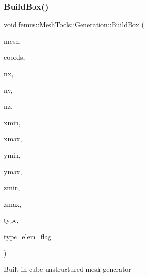 \subsubsection{\texorpdfstring{Build\+Box()}{BuildBox()}}
{\footnotesize\ttfamily void femus\+::\+Mesh\+Tools\+::\+Generation\+::\+Build\+Box (\begin{DoxyParamCaption}\item[{\mbox{\hyperlink{classfemus_1_1_mesh}{Mesh}} \&}]{mesh,  }\item[{vector$<$ vector$<$ double $>$ $>$ \&}]{coords,  }\item[{const unsigned int}]{nx,  }\item[{const unsigned int}]{ny,  }\item[{const unsigned int}]{nz,  }\item[{const double}]{xmin,  }\item[{const double}]{xmax,  }\item[{const double}]{ymin,  }\item[{const double}]{ymax,  }\item[{const double}]{zmin,  }\item[{const double}]{zmax,  }\item[{const \mbox{\hyperlink{_elem_type_enum_8hpp_a1b014294b9757a001707c979e2bab627}{Elem\+Type}}}]{type,  }\item[{std\+::vector$<$ bool $>$ \&}]{type\+\_\+elem\+\_\+flag }\end{DoxyParamCaption})}

Built-\/in cube-\/unstructured mesh generator 